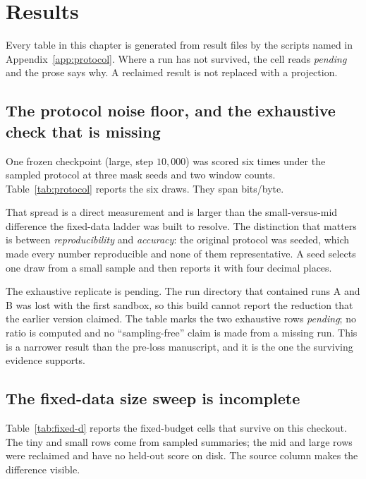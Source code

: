 \chapter{Results}
\label{ch:results}

Every table in this chapter is generated from result files by the scripts named in
Appendix~\ref{app:protocol}. Where a run has not survived, the cell reads
\emph{pending} and the prose says why. A reclaimed result is not replaced with a
projection.

\section{The protocol noise floor, and the exhaustive check that is missing}
\label{sec:protocol-result}

One frozen checkpoint (large, step $10{,}000$) was scored six times under the
sampled protocol at three mask seeds and two window counts. Table~\ref{tab:protocol}
reports the six draws. They span \ProtoOldSpread{} bits/byte.

That spread is a direct measurement and is larger than the small-versus-mid
difference the fixed-data ladder was built to resolve. The distinction that
matters is between \emph{reproducibility} and \emph{accuracy}: the original
protocol was seeded, which made every number reproducible and none of them
representative. A seed selects one draw from a small sample and then reports it
with four decimal places.

The exhaustive replicate is pending. The run directory that contained runs A and
B was lost with the first sandbox, so this build cannot report the reduction that
the earlier version claimed. The table marks the two exhaustive rows
\emph{pending}; no ratio is computed and no ``sampling-free'' claim is made from a
missing run. This is a narrower result than the pre-loss manuscript, and it is the one
the surviving evidence supports.



\section{The fixed-data size sweep is incomplete}
\label{sec:fixed-d}

Table~\ref{tab:fixed-d} reports the fixed-budget cells that survive on this
checkout. The tiny and small rows come from sampled summaries; the mid and large
rows were reclaimed and have no held-out score on disk. The source column makes
the difference visible.

